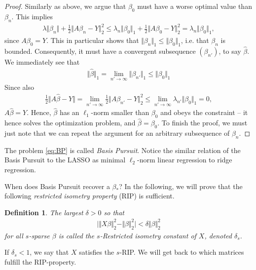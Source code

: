 \documentclass{article}
\newtheorem{defi}{Definition}
\newcommand{\abs}[1]{\vert #1 \vert}
\newcommand{\norm}[1]{\Vert #1 \Vert}
\begin{document}
\begin{proof}
    Similarly as above, we argue that $\beta_0$ must have a worse optimal value than $\beta_n$. This implies
    \begin{align*}
        \lambda \norm{\beta_n} + \tfrac{1}{2}\norm{A\beta_n- Y}_2^2 \leq \lambda_n \norm{\beta_0}_1 +\tfrac{1}{2}\norm{A\beta_0- Y}_2^2 = \lambda_n\norm{\beta_0}_1,
    \end{align*}
    since $A\beta_0 = Y$. This in particular shows that $\norm{\beta_n}_1 \leq \norm{\beta_0}_1$, i.e. that $\beta_n$ is bounded. Consequently, it must have a convergent subsequence $(\beta_{n'})$, to say $\hat{\beta}$. We immediately see that 
    \begin{align*}
        \norm{\hat{\beta}}_1 = \lim_{n'\to \infty }\norm{\beta_{n'}}_1 \leq \norm{\beta_0}_1
    \end{align*}
    Since also
    \begin{align*}
        \tfrac{1}{2}\norm{A\hat{\beta}-Y} = \lim_{n'\to \infty} \tfrac{1}{2}\norm{A\beta_{n'}- Y}_2^2 \leq \lim_{n'\to\infty}\lambda_{n'} \norm{\beta_0}_1 = 0,
    \end{align*}
    $A\hat{\beta}=Y$. Hence, $\hat{\beta}$ has an $\ell_1$-norm smaller than $\beta_0$ and obeys the constraint -- it hence solves the optimization problem, and $\hat{\beta}=\beta_0$. To finish the proof, we must just note that we can repeat the argument for an arbitrary subsequence of $\beta_n$.
   
\end{proof}

The problem \ref{eq:BP} is called \emph{Basis Pursuit}. Notice the similar relation of the Basis Pursuit to the LASSO as minimal $\ell_2$-norm linear regression to ridge regression.

When does Basis Pursuit recover a $\beta_*$? In the following, we will prove that the following \emph{restricted isometry property} (RIP) is sufficient.
\begin{defi}
    The largest $\delta>0$ so that
    \begin{align*}
        \abs{\norm{X\beta}_2^2 - \norm{\beta}_2^2}< \delta\norm{\beta}_2^2
    \end{align*}
    for all $s$-sparse $\beta$ is called the $s$-Restricted isometry constant of $X$, denoted $\delta_s$. 
\end{defi}
If $\delta_s<1$, we say that $X$ satisfies the $s$-RIP. We will get back to which matrices fulfill the RIP-property.
\end{document}
